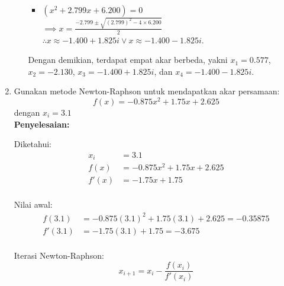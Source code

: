 \documentclass{article}
\newcommand{\penyelesaian}{\textbf{Penyelesaian: }}
\begin{document}
\begin{enumerate}
\begin{enumerate}
\begin{itemize}
            \item $(x^2 + \num{2,799}x + \num{6,200}) = 0$ \\
            $ \implies x = \frac{-\num{2,799} \pm \sqrt{(\num{2,799})^2 - 4 \times \num{6,200}}}{2}$ \\
            $ \therefore x \approx \num{-1,400} + \num{1,825}i \vee x \approx \num{-1,400} - \num{1,825}i$.
        \end{itemize} 
        
        Dengan demikian, terdapat empat akar berbeda, yakni $x_1 = \num{0,577}$, $x_2 = \num{-2,130}$, $x_3 = \num{-1,400} + \num{1,825}i$, dan $x_4 = \num{-1,400} - \num{1,825}i$.
    \end{enumerate}

    \item Gunakan metode Newton-Raphson untuk mendapatkan akar persamaan: \\
    \begin{equation*}
        f(x) = -\num{0,875}x^2 + \num{1,75}x + \num{2,625}
    \end{equation*}
    dengan $x_i = \num{3,1}$ \\
    \penyelesaian

    Diketahui: \\
    \begin{equation*}
    \begin{split}
        x_i & = \num{3,1} \\
        f(x) & = -\num{0,875}x^2 + \num{1,75}x + \num{2,625} \\
        f'(x) & = -\num{1,75}x + \num{1,75} \\ 
    \end{split}
    \end{equation*}

    Nilai awal: \\
    \begin{equation*}
    \begin{split}
        f(\num{3,1}) & = -\num{0,875}(\num{3,1})^2 + \num{1,75}(\num{3,1}) + \num{2,625} = -\num{0,35875} \\
        f'(\num{3,1}) & = -\num{1,75}(\num{3,1}) + \num{1,75} = -\num{3,675} \\
    \end{split}
    \end{equation*}

    Iterasi Newton-Raphson: \\
    \begin{equation*}
        x_{i+1} = x_i - \frac{f(x_i)}{f'(x_i)}
    \end{equation*}


\end{enumerate}
\end{document}
